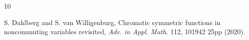 \documentclass[12pt]{amsart}  %
\theoremstyle{definition}
\theoremstyle{remark}
\numberwithin{equation}{section}
\begin{document}
\begin{thebibliography}{10}




  S. Dahlberg and S. van Willigenburg,
Chromatic symmetric functions in noncommuting
variables revisited, \emph{Adv. in Appl. Math.}  112, 101942 25pp  (2020).




%
%



%
%
%
%

 

\end{thebibliography}
\end{document}
